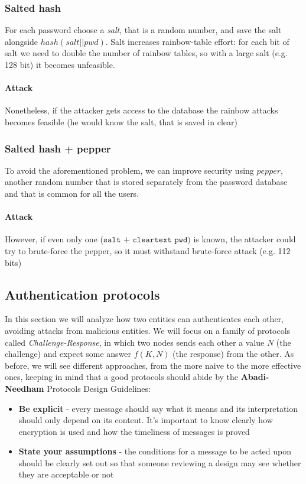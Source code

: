 \subsubsection{Salted hash} For each password choose a \textit{salt}, that is a random number, and save the salt alongside $hash(salt||pwd)$. Salt increases rainbow-table effort: for each bit of salt we need to double the number of rainbow tables, so with a large salt (e.g. 128 bit) it becomes unfeasible. 
\paragraph{Attack} Nonetheless, if the attacker gets access to the database the rainbow attacks becomes feasible (he would know the salt, that is saved in clear)

\subsubsection{Salted hash + pepper} To avoid the aforementioned problem, we can improve security using $pepper$, another random number that is stored separately from the password database and that is common for all the users. 
\paragraph{Attack} However, if even only one ($\texttt{salt + cleartext pwd})$ is known, the attacker could try to brute-force the pepper, so it must withstand brute-force attack (e.g. 112 bits)

\subsection{Authentication protocols}
In this section we will analyze how two entities can authenticates each other, avoiding attacks from malicious entities. We will focus on a family of protocols called \textit{Challenge-Response}, in which two nodes sends each other a value $N$ (the challenge) and expect some answer $f(K,N)$ (the response) from the other. As before, we will see different approaches, from the more naive to the more effective ones, keeping in mind that a good protocols should abide by the \textbf{Abadi-Needham} Protocols Design Guidelines:
\begin{itemize}
    \item \textbf{Be explicit} - every message should say what it means and its interpretation should only depend on its content. It's important to know clearly how encryption is used and how the timeliness of messages is proved
    \item \textbf{State your assumptions} - the conditions for a message to be acted upon should be clearly set out so that someone reviewing a design may see whether they are acceptable or not
\end{itemize}

